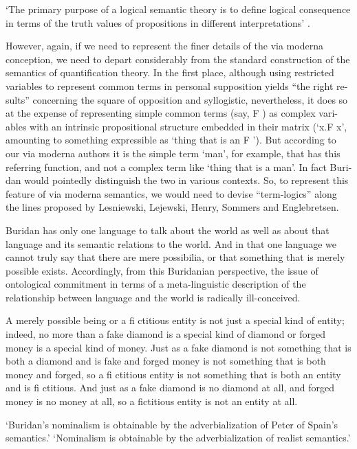 \documentclass[]{article}
\begin{document}
`The primary purpose of a logical semantic theory is to define logical consequence in terms of the truth values of propositions in different interpretations' \autocite[79]{Klima1991b}. 

However, again, if we need to represent the ﬁner details of the via moderna
conception, we need to depart considerably from the standard construction of the
semantics of quantiﬁcation theory. In the ﬁrst place, although using restricted
variables to represent common terms in personal supposition yields “the right re-
sults” concerning the square of opposition and syllogistic, nevertheless, it does so
at the expense of representing simple common terms (say, F ) as complex vari-
ables with an intrinsic propositional structure embedded in their matrix (‘x.F x’,
amounting to something expressible as ‘thing that is an F ’). But according to
our via moderna authors it is the simple term ‘man’, for example, that has this
referring function, and not a complex term like ‘thing that is a man’. In fact Buri-
dan would pointedly distinguish the two in various contexts. So, to represent this
feature of via moderna semantics, we would need to devise “term-logics” along the
lines proposed by Lesniewski, Lejewski, Henry, Sommers and Englebretsen.\autocite{Klima2008a}

Buridan has only one language to talk about the world as well as about that
language and its semantic relations to the world. And in that one language
we cannot truly say that there are mere possibilia, or that something that is
merely possible exists. Accordingly, from this Buridanian perspective, the
issue of ontological commitment in terms of a meta-linguistic description of
the relationship between language and the world is radically ill-conceived.\autocite[172]{Klima2009}

A merely possible being or a ﬁ ctitious entity is not just
a special kind of entity; indeed, no more than a fake diamond is a special
kind of diamond or forged money is a special kind of money. Just as a fake
diamond is not something that is both a diamond and is fake and forged
money is not something that is both money and forged, so a ﬁ ctitious entity
is not something that is both an entity and is ﬁ ctitious. And just as a fake
diamond is no diamond at all, and forged money is no money at all, so a
ﬁctitious entity is not an entity at all.\autocite[173]{Klima2009}

`Buridan’s nominalism is obtainable by the adverbialization of Peter
of Spain’s semantics.'
`Nominalism is obtainable by the adverbialization of realist
semantics.'
\end{document}

